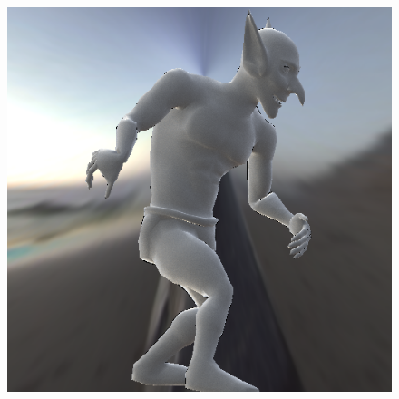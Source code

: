 \begin{figure}[H]
\endminipage\hfill
{}%
  \includegraphics[width=\linewidth]{./Imagens/brdfs/duer-goblin.png}
\endminipage
\end{figure}

